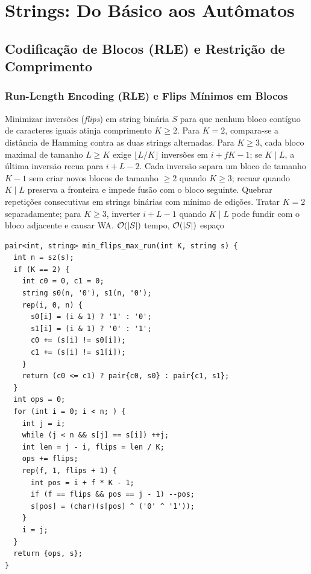 \section{Strings: Do Básico aos Autômatos}

\subsection{Codificação de Blocos (RLE) e Restrição de Comprimento}

\subsubsection{Run-Length Encoding (RLE) e Flips Mínimos em Blocos}
\algobox
  {Minimizar inversões (\emph{flips}) em string binária $S$ para que nenhum bloco contíguo de caracteres iguais atinja comprimento $K \ge 2$.}
  {Para $K = 2$, compara-se a distância de Hamming contra as duas strings alternadas. Para $K \ge 3$, cada bloco maximal de tamanho $L \ge K$ exige $\lfloor L / K \rfloor$ inversões em $i + fK - 1$; se $K \mid L$, a última inversão recua para $i + L - 2$.}
  {Cada inversão separa um bloco de tamanho $K - 1$ sem criar novos blocos de tamanho $\ge 2$ quando $K \ge 3$; recuar quando $K \mid L$ preserva a fronteira e impede fusão com o bloco seguinte.}
  {Quebrar repetições consecutivas em strings binárias com mínimo de edições.}
  {Tratar $K = 2$ separadamente; para $K \ge 3$, inverter $i + L - 1$ quando $K \mid L$ pode fundir com o bloco adjacente e causar WA.}
  {$\mathcal{O}(|S|)$ tempo, $\mathcal{O}(|S|)$ espaço}

\begin{lstlisting}
pair<int, string> min_flips_max_run(int K, string s) {
  int n = sz(s);
  if (K == 2) {
    int c0 = 0, c1 = 0;
    string s0(n, '0'), s1(n, '0');
    rep(i, 0, n) {
      s0[i] = (i & 1) ? '1' : '0';
      s1[i] = (i & 1) ? '0' : '1';
      c0 += (s[i] != s0[i]);
      c1 += (s[i] != s1[i]);
    }
    return (c0 <= c1) ? pair{c0, s0} : pair{c1, s1};
  }
  int ops = 0;
  for (int i = 0; i < n; ) {
    int j = i;
    while (j < n && s[j] == s[i]) ++j;
    int len = j - i, flips = len / K;
    ops += flips;
    rep(f, 1, flips + 1) {
      int pos = i + f * K - 1;
      if (f == flips && pos == j - 1) --pos;
      s[pos] = (char)(s[pos] ^ ('0' ^ '1'));
    }
    i = j;
  }
  return {ops, s};
}
\end{lstlisting}

